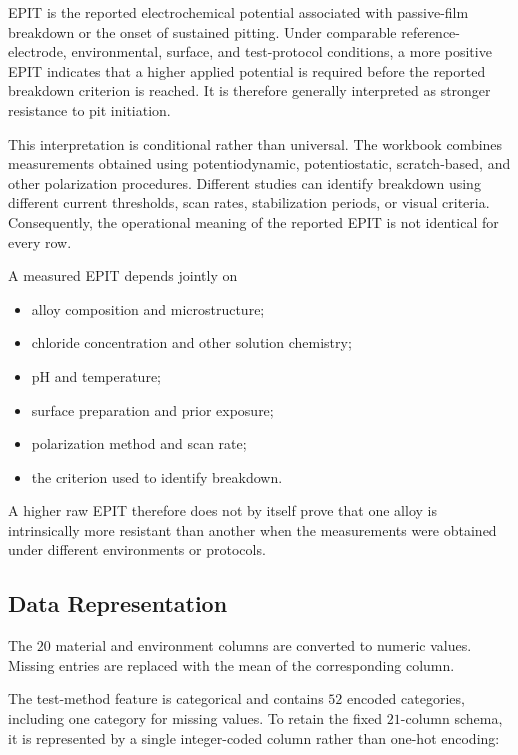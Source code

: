 \documentclass{article}
\begin{document}
EPIT is the reported electrochemical potential associated with passive-film breakdown or the onset of sustained pitting. Under comparable reference-electrode, environmental, surface, and test-protocol conditions, a more positive EPIT indicates that a higher applied potential is required before the reported breakdown criterion is reached. It is therefore generally interpreted as stronger resistance to pit initiation.

This interpretation is conditional rather than universal. The workbook combines measurements obtained using potentiodynamic, potentiostatic, scratch-based, and other polarization procedures. Different studies can identify breakdown using different current thresholds, scan rates, stabilization periods, or visual criteria. Consequently, the operational meaning of the reported EPIT is not identical for every row.

A measured EPIT depends jointly on

\begin{itemize}
    \item alloy composition and microstructure;
    \item chloride concentration and other solution chemistry;
    \item pH and temperature;
    \item surface preparation and prior exposure;
    \item polarization method and scan rate;
    \item the criterion used to identify breakdown.
\end{itemize}

A higher raw EPIT therefore does not by itself prove that one alloy is intrinsically more resistant than another when the measurements were obtained under different environments or protocols.

\subsection{Data Representation}

The \(20\) material and environment columns are converted to numeric values. Missing entries are replaced with the mean of the corresponding column.

The test-method feature is categorical and contains \(52\) encoded categories, including one category for missing values. To retain the fixed \(21\)-column schema, it is represented by a single integer-coded column rather than one-hot encoding:
\end{document}
